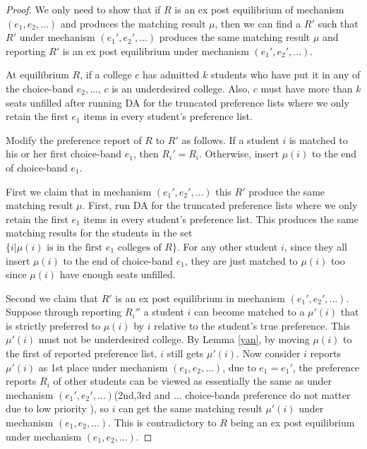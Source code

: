 \begin{proof}
  We only need to show that if $R$ is an ex post equilibrium of mechanism $(e_1,e_2,...)$ and produces the matching result $\mu$, then we can find a $R'$ such that $R'$ under mechanism $(e_1',e_2',...)$ produces the same matching result $\mu$ and reporting $R'$ is an ex post equilibrium under mechanism $(e_1',e_2',...)$.

  At equilibrium $R$, if a college $c$ has admitted $k$ students who have put it in any of the choice-band $e_2,...$, $c$ is an underdesired college. Also, $c$ must have more than $k$ seats unfilled after running  DA for the truncated preference lists where we only retain the first $e_1$ items in every student's preference list.

  Modify the preference report of $R$ to $R'$ as follows. If a student $i$ is matched to his or her first choice-band $e_1$, then $R_i'=R_i$. Otherwise, insert $\mu(i)$ to the end of choice-band $e_1$.

  First we claim that in mechanism $(e_1',e_2',...)$ this $R'$ produce the same matching result $\mu$. First, run  DA for the truncated preference lists where we only retain the first $e_1$ items in every student's preference list. This produces the same matching results for the students in the set $\{i| \mu(i) \text{ is in the first } e_1 \text{ colleges of } R\}$.  For any other student $i$, since they all insert $\mu(i)$ to the end of choice-band $e_1$, they are just matched to $\mu(i)$ too since $\mu(i)$ have enough seats unfilled.

  Second we claim that $R'$ is an ex post equilibrium in mechanism $(e_1',e_2',...)$.  Suppose through reporting $R_i''$ a student $i$ can become matched to a $\mu'(i)$ that is strictly preferred to $\mu(i)$ by $i$ relative to the student's true preference.  This $\mu'(i)$ must not be underdesired college. By Lemma \ref{yan}, by moving $\mu(i)$ to the first of reported preference list, $i$ still gets $\mu'(i)$. Now consider $i$ reports $\mu'(i)$ as 1st place under mechanism $(e_1,e_2,...)$, due to $e_1=e_1'$, the preference reports $R_i$ of other students can be viewed as essentially the same as under mechanism $(e_1',e_2',...)$(2nd,3rd and ...  choice-bands preference do not matter due to low priority ), so $i$ can get the same matching result  $\mu'(i)$ under mechanism $(e_1,e_2,...)$. This is contradictory to $R$ being an ex post equilibrium under mechanism $(e_1,e_2,...)$.
\end{proof}




